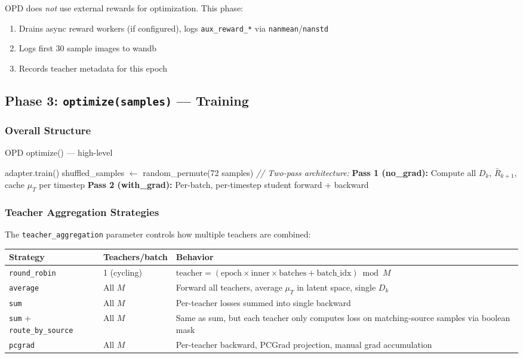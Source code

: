 \documentclass[11pt]{article}
\begin{document}
OPD does \emph{not} use external rewards for optimization. This phase:
\begin{enumerate}[nosep]
    \item Drains async reward workers (if configured), logs \texttt{aux\_reward\_*} via \texttt{nanmean}/\texttt{nanstd}
    \item Logs first 30 sample images to wandb
    \item Records teacher metadata for this epoch
\end{enumerate}

\subsection{Phase 3: \texttt{optimize(samples)} --- Training}

\subsubsection{Overall Structure}

\begin{algorithm}[H]
\caption{OPD optimize() --- high-level}
\begin{algorithmic}
\STATE adapter.train()
    \STATE shuffled\_samples $\leftarrow$ random\_permute(72 samples)
    \STATE \textit{// Two-pass architecture:}
    \STATE \textbf{Pass 1 (no\_grad):} Compute all $D_k$, $\bar{R}_{k+1}$, cache $\mu_T$ per timestep
    \STATE \textbf{Pass 2 (with\_grad):} Per-batch, per-timestep student forward + backward
\ENDFOR
\end{algorithmic}
\end{algorithm}

\subsubsection{Teacher Aggregation Strategies}

The \texttt{teacher\_aggregation} parameter controls how multiple teachers are combined:

\begin{table}[h]
\centering
\small
\begin{tabular}{llp{7cm}}
\toprule
Strategy & Teachers/batch & Behavior \\
\midrule
\texttt{round\_robin} & 1 (cycling) & $\text{teacher} = (\text{epoch} \times \text{inner} \times \text{batches} + \text{batch\_idx}) \bmod M$ \\
\texttt{average} & All $M$ & Forward all teachers, average $\mu_T$ in latent space, single $D_k$ \\
\texttt{sum} & All $M$ & Per-teacher losses summed into single backward \\
\texttt{sum} + \texttt{route\_by\_source} & All $M$ & Same as sum, but each teacher only computes loss on matching-source samples via boolean mask \\
\texttt{pcgrad} & All $M$ & Per-teacher backward, PCGrad projection, manual grad accumulation \\
\bottomrule
\end{tabular}
\end{table}
\end{document}
